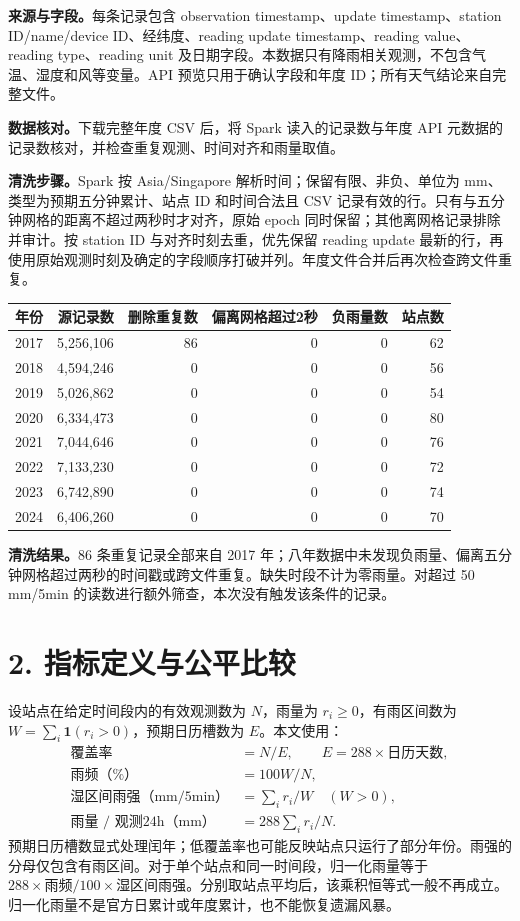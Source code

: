 \documentclass[UTF8,fontset=fandol,10pt,a4paper,landscape]{ctexart}
\begin{document}
\textbf{来源与字段。}每条记录包含 observation timestamp、update timestamp、station ID/name/device ID、经纬度、reading update timestamp、reading value、reading type、reading unit 及日期字段。本数据只有降雨相关观测，不包含气温、湿度和风等变量。API 预览只用于确认字段和年度 ID；所有天气结论来自完整文件。

\textbf{数据核对。}下载完整年度 CSV 后，将 Spark 读入的记录数与年度 API 元数据的记录数核对，并检查重复观测、时间对齐和雨量取值。

\textbf{清洗步骤。}Spark 按 Asia/Singapore 解析时间；保留有限、非负、单位为 mm、类型为预期五分钟累计、站点 ID 和时间合法且 CSV 记录有效的行。只有与五分钟网格的距离不超过两秒时才对齐，原始 epoch 同时保留；其他离网格记录排除并审计。按 station ID 与对齐时刻去重，优先保留 reading update 最新的行，再使用原始观测时刻及确定的字段顺序打破并列。年度文件合并后再次检查跨文件重复。
\begin{center}\begin{tabular}{rrrrrr}
\toprule
年份 & 源记录数 & 删除重复数 & 偏离网格超过2秒 & 负雨量数 & 站点数\\\midrule
2017 & 5,256,106 & 86 & 0 & 0 & 62\\
2018 & 4,594,246 & 0 & 0 & 0 & 56\\
2019 & 5,026,862 & 0 & 0 & 0 & 54\\
2020 & 6,334,473 & 0 & 0 & 0 & 80\\
2021 & 7,044,646 & 0 & 0 & 0 & 76\\
2022 & 7,133,230 & 0 & 0 & 0 & 72\\
2023 & 6,742,890 & 0 & 0 & 0 & 74\\
2024 & 6,406,260 & 0 & 0 & 0 & 70\\
\bottomrule\end{tabular}\end{center}

\textbf{清洗结果。}86 条重复记录全部来自 2017 年；八年数据中未发现负雨量、偏离五分钟网格超过两秒的时间戳或跨文件重复。缺失时段不计为零雨量。对超过 50 mm/5min 的读数进行额外筛查，本次没有触发该条件的记录。

\clearpage\section*{2. 指标定义与公平比较}
设站点在给定时间段内的有效观测数为 $N$，雨量为 $r_i\geq0$，有雨区间数为 $W=\sum_i\mathbf{1}(r_i>0)$，预期日历槽数为 $E$。本文使用：
\begin{align*}
\text{覆盖率} &= N/E,\qquad E=288\times\text{日历天数},\\
\text{雨频（\%）} &=100W/N,\\
\text{湿区间雨强（mm/5min）} &=\sum_i r_i/W\quad(W>0),\\
\text{雨量 / 观测24h（mm）} &=288\sum_i r_i/N.
\end{align*}
预期日历槽数显式处理闰年；低覆盖率也可能反映站点只运行了部分年份。雨强的分母仅包含有雨区间。对于单个站点和同一时间段，归一化雨量等于 $288\times\text{雨频}/100\times\text{湿区间雨强}$。分别取站点平均后，该乘积恒等式一般不再成立。归一化雨量不是官方日累计或年度累计，也不能恢复遗漏风暴。
\end{document}
